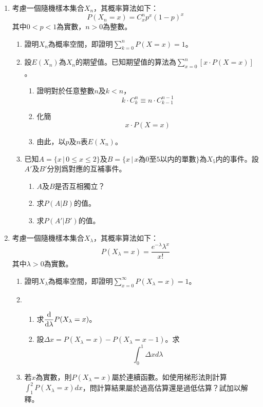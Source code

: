 \documentclass[12pt]{article}
\begin{document}
    \begin{enumerate}
        \item 考慮一個隨機樣本集合$X_n$，其概率算法如下：$$P(X_n=x)=C^n_x p^x (1-p)^x$$ 其中$0<p<1$為實數，$n>0$為整數。\begin{enumerate}
            \item 證明$X_n$為概率空間，即證明$\displaystyle\sum_{k=0}^{n}P(X=x)=1$。
            \item 設$E(X_n)$為$X_n$的期望值。已知期望值的算法為$\displaystyle\sum_{x=0}^{n}[x\cdot P(X=x)]$。\begin{enumerate}
                \item 證明對於任意整數$n$及$k<n$，$$k\cdot C_k^n \equiv n\cdot C_{k-1}^{n-1}$$
                \item 化簡$$x\cdot P(X=x)$$
                \item 由此，以$p$及$n$表$E(X_n)$。
            \end{enumerate}
            \item 已知$A=\{x\, |\, 0\leq x \leq 2\}$及$B=\{x\, |\, x\textrm{為0至5以内的單數}\}$為$X_5$内的事件。設$A'$及$B'$分別爲對應的互補事件。\begin{enumerate}
                \item $A$及$B$是否互相獨立？
                \item 求$P(A|B)$的值。
                \item 求$P(A'|B')$的值。
            \end{enumerate}
        \end{enumerate}
        \item 考慮一個隨機樣本集合$X_{\lambda}$，其概率算法如下：$$P(X_{\lambda}=x)=\frac{e^{-\lambda} \lambda^x}{x!}$$其中$\lambda>0$為實數。\begin{enumerate}
            \item 證明$X_\lambda$為概率空間，即證明$\displaystyle\sum_{x=0}^{\infty}P(X_{\lambda}=x)=1$。
            \item \begin{enumerate}
                \item 求$\displaystyle \derivative{\lambda}P(X_{\lambda}=x)$。
                \item 設$\Delta x = P(X_{\lambda}=x) - P(X_{\lambda}=x-1)$。求$$\int_{0}^{1} \Delta x d\lambda$$
            \end{enumerate}
            \item 若$x$為實數，則$P(X_{\lambda}=x)$屬於連續函數。如使用梯形法則計算$\displaystyle \int_1^2 P(X_{\lambda}=x) dx$，問計算結果屬於過高估算還是過低估算？試加以解釋。

\end{enumerate}
\end{enumerate}
\end{document}
